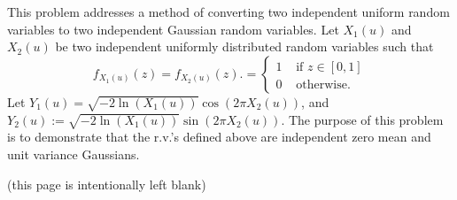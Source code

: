 This problem addresses a method of converting two independent uniform random variables to two independent Gaussian random variables. Let $X_1(u)$ and $X_2(u)$ be two independent uniformly distributed random variables such that $$f_{X_1(u)}(z)=f_{X_2(u)}(z).=\begin{cases}1&\text{ if $z\in[0,1]$}\\0&\text{ otherwise.}\end{cases}$$ 
Let $Y_1(u)=\sqrt{-2\ln(X_1(u))}\cos(2\pi X_2(u))$, and $Y_2(u):=\sqrt{-2\ln(X_1(u))}\sin(2\pi X_2(u))$. The purpose of this problem is to demonstrate that the r.v.'s defined above are independent zero mean and unit variance Gaussians.
\newpage (this page is intentionally left blank)
\newpage

